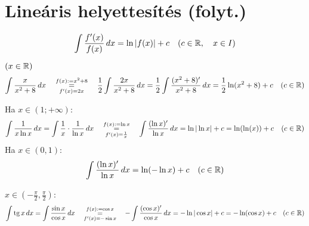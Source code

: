 \documentclass[a4paper,11.5pt]{article}
\DeclareMathOperator{\tg}{tg}
\begin{document}
	\section{Lineáris helyettesítés (folyt.)}
	\begin{task}
		\[ \int\frac{f'(x)}{f(x)}\,dx=\ln |f(x)|+c \quad (c\in\mathbb{R}, \quad x\in I)\]
	\end{task}
	\begin{task}$(x\in\mathbb{R})$
		\[ \int\frac{x}{x^2+8}\,dx\quad \overset{f(x):=x^2+8}{\underset{f'(x)=2x}{=}}\quad\frac{1}{2}\int\frac{2x}{x^2+8}\,dx=\frac{1}{2}\int\frac{(x^2+8)'}{x^2+8}\,dx=\frac{1}{2}\ln(x^2+8)+c\quad (c\in\mathbb{R})  \]
	\end{task}
	\begin{task}Ha $x\in(1;+\infty)$:
		\[ \int\frac{1}{x\ln x}\,dx= \int\frac{1}{x}\cdot\frac{1}{\ln x}\,dx\quad \overset{f(x):=\ln x}{\underset{f'(x)=\frac{1}{x}}{=}}\quad \int\frac{(\ln x)'}{\ln x}\,dx=\ln|\ln x|+c=\ln(\ln(x))+c\quad (c\in\mathbb{R}) \]
		Ha $x\in(0,1)$:
		\[ \int\frac{(\ln x)'}{\ln x}\,dx=\ln(-\ln x)+c\quad (c\in\mathbb{R}) \]
	\end{task}
	\begin{task}$x\in\left(-\frac{\pi}{2},\frac{\pi}{2}\right)$:
		\[ \int\tg x\,dx=\int\frac{\sin x}{\cos x}\,dx\quad \overset{f(x):=\cos x}{\underset{f'(x)=-\sin x}{=}}\quad -\int\frac{(\cos x)'}{\cos x}\,dx=-\ln|\cos x|+c=-\ln(\cos x)+c\quad (c\in\R) \]
	\end{task}
\end{document}
